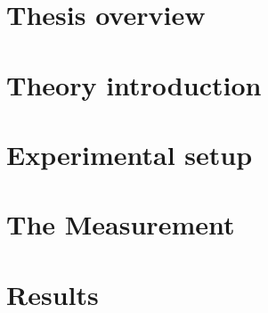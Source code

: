 \documentclass[11pt,notitlepage,twoside,BCOR=8.25mm,headsepline,numbers=noendperiod,DIV=14]{scrbook} %
\begin{document}


  \dominitoc[n]  

%


%

\tableofcontents



\linenumbers
  \mainmatter
  \part{Thesis overview}
  
  \part{Theory introduction}
  
  
  \part{Experimental setup}
  
  
  
  
  
  
  \part{The Measurement}
  
  
  
  
  
  
   \part{Results}
  

  
\end{document}
